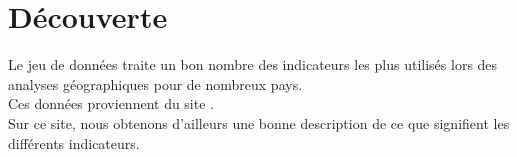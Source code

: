 \section{Découverte}
Le jeu de données traite un bon nombre des indicateurs les plus utilisés lors des analyses géographiques pour de nombreux pays.\\
Ces données proviennent du site \lesite.\\
Sur ce site, nous obtenons d'ailleurs une bonne description de ce que signifient les différents indicateurs.